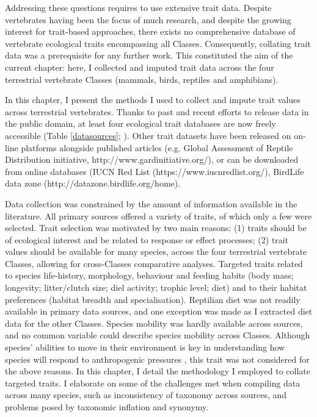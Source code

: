 Addressing these questions requires to use extensive trait data. Despite vertebrates having been the focus of much research, and despite the growing interest for trait-based approaches, there exists no comprehensive database of vertebrate ecological traits encompassing all Classes. Consequently, collating trait data was a prerequisite for any further work. This constituted the aim of the current chapter: here, I collected and imputed trait data across the four terrestrial vertebrate Classes (mammals, birds, reptiles and amphibians).

In this chapter, I present the methods I used to collect and impute trait values across terrestrial vertebrates. Thanks to past and recent efforts to release data in the public domain, at least four ecological trait databases are now freely accessible (Table \ref{datasources}; \citet{Cooke2019}). Other trait datasets have been released on on-line platforms alongside published articles (e.g. Global Assessment of Reptile Distribution initiative, http://www.gardinitiative.org/), or can be downloaded from online databases (IUCN Red List (https://www.iucnredlist.org/), BirdLife data zone (http://datazone.birdlife.org/home). 

Data collection was constrained by the amount of information available in the literature.  All  primary sources offered a variety of traits, of which only a few were selected. Trait selection was motivated by two main reasons: (1) traits should be of ecological interest and be related to response or effect processes; (2) trait values should be available for many species, across the four terrestrial vertebrate Classes, allowing for cross-Classes comparative analyses. Targeted traits related to species life-history, morphology, behaviour and feeding habits (body mass; longevity; litter/clutch size; diel activity; trophic level; diet) and to their habitat preferences (habitat breadth and specialisation). Reptilian diet was not readily available in primary data sources, and one exception was made as I extracted diet data for the other Classes. Species mobility was hardly available across sources, and no common variable could describe species mobility across Classes. Although species' abilities to move in their environment is key in understanding how species will respond to anthropogenic pressures \citep{Schloss2012b, Barbet-Massin2012,Pearson2006}, this trait was not considered for the above reasons. In this chapter, I detail the methodology I employed to collate targeted traits. I elaborate on some of the challenges met when compiling data across many species, such as inconsistency of taxonomy across sources, and problems posed by taxonomic inflation and synonymy.

